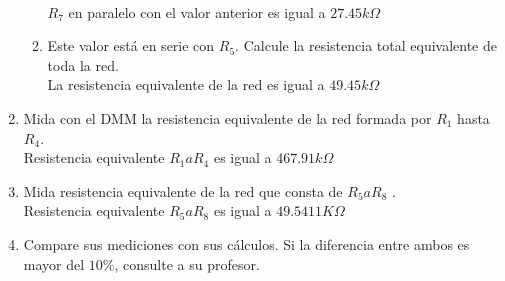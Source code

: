 \begin{enumerate}
\begin{enumerate}
		\\ $R_{7}$ en paralelo con el valor anterior es igual a $27.45k\Omega$
		\item Este valor está en serie con $R_{5}$. Calcule la resistencia total equivalente de toda la red.
		\\ La resistencia equivalente de la red es igual a $49.45k\Omega$
	\end{enumerate}
	\item Mida con el DMM la resistencia equivalente de la red formada por $R_{1}$ hasta $R_{4}$.
	\\ Resistencia equivalente $R_{1} a R_{4}$ es igual a $467.91k \Omega$
	\item Mida resistencia equivalente de la red que consta de $R_{5} a R_{8}$ .
	\\ Resistencia equivalente $R_{5} a R_{8}$  es igual a $49.5411 K \Omega$
	\item Compare sus mediciones con sus cálculos. Si la diferencia entre ambos es mayor del $10\%$, consulte a su profesor.
	\begin{table}[htbp]
		\centering
		

\end{table}
\end{enumerate}
